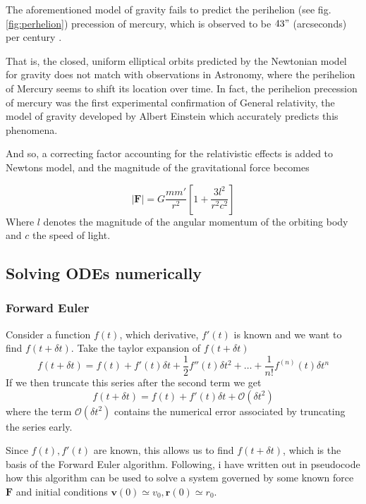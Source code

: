 \documentclass[10pt,showpacs,preprintnumbers,amsmath,amssymb,nofootinbib,aps,prl,twocolumn,groupedaddress,superscriptaddress,showkeys]{revtex4-1}
\begin{document}
      The aforementioned model of gravity fails to predict the perihelion (see fig. \ref{fig:perhelion}) precession of mercury, which is observed to be $43"$ (arcseconds) per century \cite{problem_set}. 

      That is, the closed, uniform elliptical orbits predicted by the Newtonian model for gravity does not match with observations in Astronomy, where the perihelion of Mercury seems to shift its location over time. In fact, the perihelion precession of mercury was the first experimental confirmation of General relativity, the model of gravity developed by Albert Einstein which accurately predicts this phenomena.

      And so, a correcting factor accounting for the relativistic effects is added to Newtons model, and the magnitude of the gravitational force becomes \cite{problem_set}

      \begin{equation}
        |\mathbf F| = G \frac{m m'}{r^2}\left[1 + \frac{3l^2}{r^2c^2}\right]
        \label{eqn:relativistic correction}
      \end{equation}
      Where $l$ denotes the magnitude of the angular momentum of the orbiting body and $c$ the speed of light.
\subsection{Solving ODEs numerically}
  \subsubsection{Forward Euler}
    Consider a function $f(t)$, which derivative, $f'(t)$ is known and we want to find $f(t + \delta t)$. 
    Take the taylor expansion of $f(t + \delta t)$
    \begin{equation}
      f(t + \delta t) = f(t) + f'(t)\delta t + \frac{1}{2}f''(t)\delta t^2 + \dots + \frac{1}{n!}f^{(n)}(t)\delta t^n
    \end{equation}
    If we then truncate this series after the second term we get
    \begin{equation}
      f(t + \delta t) = f(t) + f'(t)\delta t + \mathcal O(\delta t^2)
    \end{equation}
    where the term $\mathcal O(\delta t^2)$ contains the numerical error associated by truncating the series early.

    Since $f(t), f'(t)$ are known, this allows us to find $f(t + \delta t)$, which is the basis of the Forward Euler algorithm. Following, i have written out in pseudocode how this algorithm can be used to solve a system governed by some known force $\mathbf F$ and initial conditions $\mathbf v(0) \simeq v_0, \mathbf r(0) \simeq r_0$.
\end{document}
